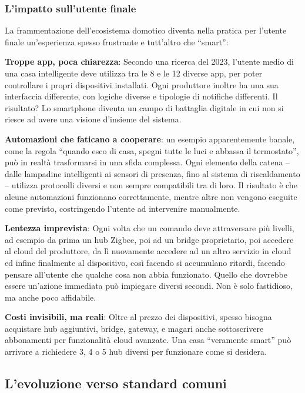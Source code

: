 \subsubsection{L'impatto sull'utente finale}

La frammentazione dell’ecosistema domotico diventa nella pratica per l’utente finale un’esperienza spesso frustrante e tutt’altro che “smart”:

\textbf{Troppe app, poca chiarezza}: Secondo una ricerca del 2023, l’utente medio di una casa intelligente deve utilizza tra le 8 e le 12 diverse app, per poter controllare i propri dispositivi installati. Ogni produttore inoltre ha una sua interfaccia differente, con logiche diverse e tipologie di notifiche differenti. Il risultato? Lo smartphone diventa un campo di battaglia digitale in cui non si riesce ad avere una visione d’insieme del sistema.

\textbf{Automazioni che faticano a cooperare}: un esempio apparentemente banale, come la regola “quando esco di casa, spegni tutte le luci e abbassa il termostato”, può in realtà trasformarsi in una sfida complessa. Ogni elemento della catena – dalle lampadine intelligenti ai sensori di presenza, fino al sistema di riscaldamento – utilizza protocolli diversi e non sempre compatibili tra di loro. Il risultato è che alcune automazioni funzionano correttamente, mentre altre non vengono eseguite come previsto, costringendo l’utente ad intervenire manualmente. 

\textbf{Lentezza imprevista}: Ogni volta che un comando deve attraversare più livelli, ad esempio da prima un hub Zigbee, poi ad un bridge proprietario, poi accedere al cloud del produttore, da lì nuovamente accedere ad un altro servizio in cloud ed infine finalmente al dispositivo, così facendo si accumulano ritardi, facendo pensare all'utente che qualche cosa non abbia funzionato. Quello che dovrebbe essere un’azione immediata può impiegare diversi secondi. Non è solo fastidioso, ma anche poco affidabile.

\textbf{Costi invisibili, ma reali}: Oltre al prezzo dei dispositivi, spesso bisogna acquistare hub aggiuntivi, bridge, gateway, e magari anche sottoscrivere abbonamenti per funzionalità cloud avanzate. Una casa “veramente smart” può arrivare a richiedere 3, 4 o 5 hub diversi per funzionare come si desidera.

\subsection{L'evoluzione verso standard comuni}

